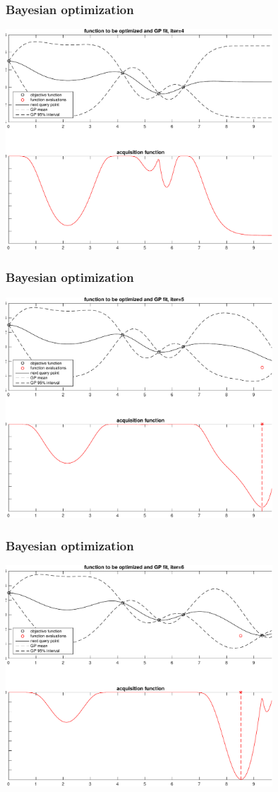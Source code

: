 \documentclass[10pt,handout]{beamer}
\begin{document}
\begin{frame}

\frametitle{Bayesian optimization}

    \includegraphics[width=10cm]{figs/bayesopt_1d_regular_iter4-crop.pdf}

\end{frame}
\begin{frame}

\frametitle{Bayesian optimization}

    \includegraphics[width=10cm]{figs/bayesopt_1d_regular_iter5-crop.pdf}

\end{frame}
\begin{frame}

\frametitle{Bayesian optimization}

    \includegraphics[width=10cm]{figs/bayesopt_1d_regular_iter6-crop.pdf}

\end{frame}
\end{document}
